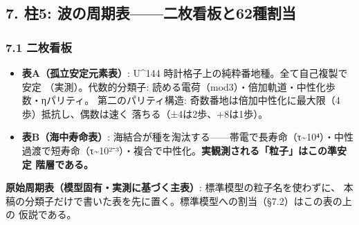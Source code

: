 \documentclass[
]{ltjsarticle}
\providecommand{\tightlist}{%
  \setlength{\itemsep}{0pt}\setlength{\parskip}{0pt}}
\begin{document}
\subsection{7. 柱5:
波の周期表------二枚看板と62種割当}\label{ux67f15-ux6ce2ux306eux5468ux671fux8868ux4e8cux679aux770bux677fux306862ux7a2eux5272ux5f53}

\subsubsection{7.1 二枚看板}\label{ux4e8cux679aux770bux677f}

\begin{itemize}
\tightlist
\item
  \textbf{表A（孤立安定元素表）}: U\^{}144
  時計格子上の純粋番地種。全て自己複製で安定 （実測）。代数的分類子:
  読める電荷（mod3）・倍加軌道・中性化歩数・ηパリティ。
  第二のパリティ構造:
  奇数番地は倍加中性化に最大限（4歩）抵抗し、偶数は速く
  落ちる（±4は2歩、+8は1歩）。
\item
  \textbf{表B（海中寿命表）}:
  海結合が種を淘汰する------帯電で長寿命（τ\textasciitilde10⁴）・中性
  過渡で短寿命（τ\textasciitilde10²⁻³）・複合で中性化。\textbf{実観測される「粒子」はこの準安定
  階層である。}
\end{itemize}

\textbf{原始周期表（模型固有・実測に基づく主表）}:
標準模型の粒子名を使わずに、
本稿の分類子だけで書いた表を先に置く。標準模型への割当（§7.2）はこの表の上の
仮説である。
\end{document}
